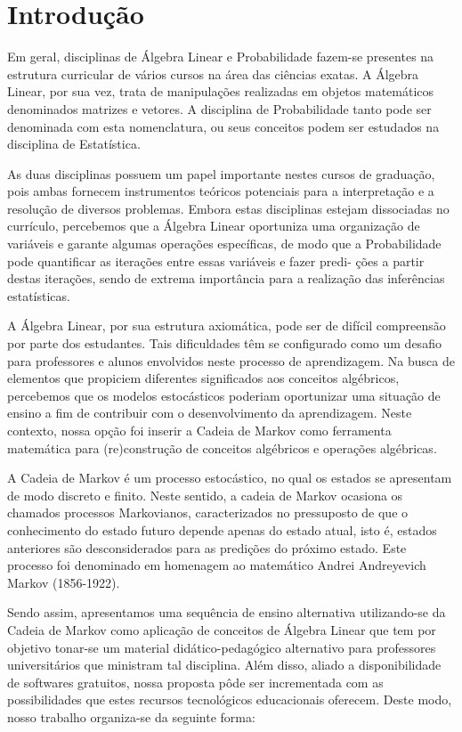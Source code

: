 \chapter*{Introdução}
Em geral, disciplinas de Álgebra Linear e Probabilidade fazem-se presentes na estrutura
curricular de vários cursos na área das ciências exatas. A Álgebra Linear, por sua vez, trata de
manipulações realizadas em objetos matemáticos denominados matrizes e vetores. A disciplina
de Probabilidade tanto pode ser denominada com esta nomenclatura, ou seus conceitos podem
ser estudados na disciplina de Estatística.

As duas disciplinas possuem um papel importante nestes cursos de graduação, pois ambas fornecem instrumentos teóricos potenciais para a interpretação e a resolução de diversos
problemas. Embora estas disciplinas estejam dissociadas no currículo, percebemos que a Álgebra Linear oportuniza uma organização de variáveis e garante algumas operações específicas,
de modo que a Probabilidade pode quantificar as iterações entre essas variáveis e fazer predi-
ções a partir destas iterações, sendo de extrema importância para a realização das inferências
estatísticas.

A Álgebra Linear, por sua estrutura axiomática, pode ser de difícil compreensão por parte
dos estudantes. Tais dificuldades têm se configurado como um desafio para professores e alunos
envolvidos neste processo de aprendizagem. Na busca de elementos que propiciem diferentes
significados aos conceitos algébricos, percebemos que os modelos estocásticos poderiam oportunizar uma situação de ensino a fim de contribuir com o desenvolvimento da aprendizagem.
Neste contexto, nossa opção foi inserir a Cadeia de Markov como ferramenta matemática para
(re)construção de conceitos algébricos e operações algébricas.

A Cadeia de Markov é um processo estocástico, no qual os estados se apresentam de modo
discreto e finito. Neste sentido, a cadeia de Markov ocasiona os chamados processos Markovianos, caracterizados no pressuposto de que o conhecimento do estado futuro depende apenas
do estado atual, isto é, estados anteriores são desconsiderados para as predições do próximo
estado. Este processo foi denominado em homenagem ao matemático Andrei Andreyevich
Markov (1856-1922).

Sendo assim, apresentamos uma sequência de ensino alternativa utilizando-se da Cadeia
de Markov como aplicação de conceitos de Álgebra Linear que tem por objetivo tonar-se um
material didático-pedagógico alternativo para professores universitários que ministram tal disciplina. Além disso, aliado a disponibilidade de softwares gratuitos, nossa proposta pôde ser incrementada com as possibilidades que estes recursos tecnológicos educacionais oferecem.
Deste modo, nosso trabalho organiza-se da seguinte forma:

